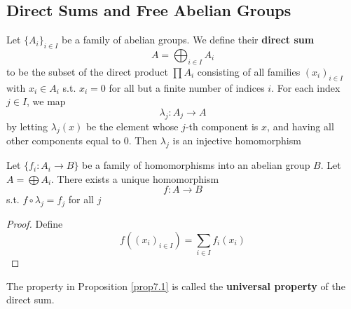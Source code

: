 \documentclass[11pt]{article}
\begin{document}
\subsection{Direct Sums and Free Abelian Groups}
\label{sec:orgc017116}
Let \(\{A_i\}_{i\in I}\) be a family of abelian groups. We define their \textbf{direct sum}
\begin{equation*}
A=\bigoplus_{i\in I}A_i
\end{equation*}
to be the subset of the direct product \(\prod A_i\) consisting of all families \((x_i)_{i\in I}\)
with \(x_i\in A_i\) s.t. \(x_i=0\) for all but a finite number of indices \(i\). For each
index \(j\in I\), we map
\begin{equation*}
\lambda_j:A_j\to A
\end{equation*}
by letting \(\lambda_j(x)\) be the element whose \(j\)-th component is \(x\), and having all other
components equal to 0. Then \(\lambda_j\) is an injective homomorphism

\begin{proposition}[]
\label{prop7.1}
Let \(\{f_i:A_i\to B\}\) be a family of homomorphisms into an abelian group \(B\). Let \(A=\bigoplus A_i\).
There exists a unique homomorphism
\begin{equation*}
f:A\to B
\end{equation*}
s.t. \(f\circ\lambda_j=f_j\) for all \(j\)
\end{proposition}

\begin{proof}
Define
\begin{equation*}
f((x_i)_{i\in I})=\sum_{i\in I}f_i(x_i)
\end{equation*}
\end{proof}

The property in Proposition \ref{prop7.1} is called the \textbf{universal property} of the direct sum.
\end{document}
